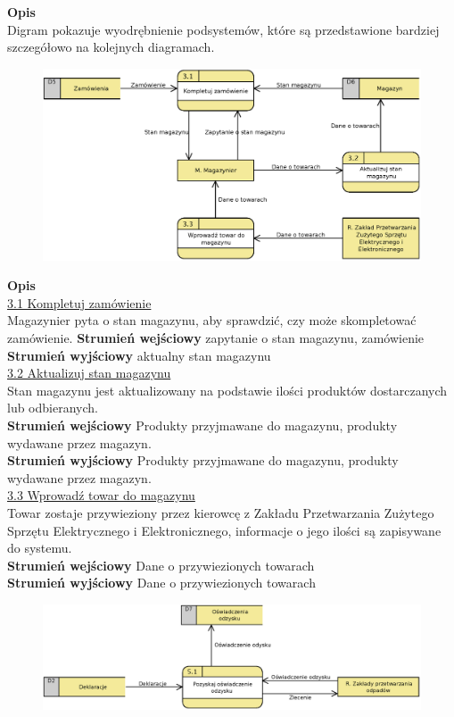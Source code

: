 \linespread{1.6}

\textbf{Opis}\\
Digram pokazuje wyodrębnienie podsystemów, które są przedstawione bardziej szczegółowo na kolejnych diagramach.


\begin{figure}[H]
	\centering
	\includegraphics[width=\textwidth]{img/DFD/2-level-magazyn.eps}
\end{figure}

\textbf{Opis} \\
\underline{3.1 Kompletuj zamówienie}\\
Magazynier pyta o stan magazynu, aby sprawdzić, czy może skompletować zamówienie.
\textbf{Strumień wejściowy} zapytanie o stan magazynu, zamówienie\\
\textbf{Strumień wyjściowy} aktualny stan magazynu\\

\underline{3.2 Aktualizuj stan magazynu}\\ 
Stan magazynu jest aktualizowany na podstawie ilości produktów dostarczanych lub odbieranych.\\	
\textbf{Strumień wejściowy} Produkty przyjmawane do magazynu, produkty wydawane przez magazyn.\\
\textbf{Strumień wyjściowy} Produkty przyjmawane do magazynu, produkty wydawane przez magazyn.\\
\underline{3.3 Wprowadź towar do magazynu}\\
Towar zostaje przywieziony przez kierowcę z Zakładu Przetwarzania Zużytego Sprzętu Elektrycznego i Elektronicznego, informacje o jego ilości są zapisywane do systemu.\\
\textbf{Strumień wejściowy} Dane o przywiezionych towarach\\
\textbf{Strumień wyjściowy} Dane o przywiezionych towarach

\begin{figure}[H]
	\centering
	\includegraphics[width=\textwidth]{img/DFD/2-level-skup.eps}
\end{figure}